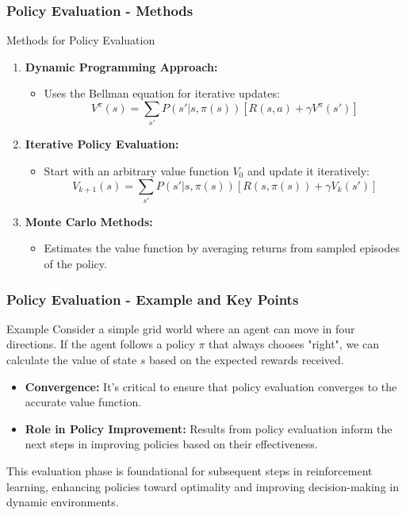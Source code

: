 \documentclass[aspectratio=169]{beamer}
\begin{document}
\begin{frame}[fragile]
    \frametitle{Policy Evaluation - Methods}
    \begin{block}{Methods for Policy Evaluation}
        \begin{enumerate}
            \item \textbf{Dynamic Programming Approach:}
            \begin{itemize}
                \item Uses the Bellman equation for iterative updates:
                \begin{equation}
                    V^\pi(s) = \sum_{s'} P(s'|s,\pi(s)) [R(s,a) + \gamma V^\pi(s')]
                \end{equation}
            \end{itemize}
            \item \textbf{Iterative Policy Evaluation:}
            \begin{itemize}
                \item Start with an arbitrary value function \(V_0\) and update it iteratively:
                \begin{equation}
                    V_{k+1}(s) = \sum_{s'} P(s'|s,\pi(s)) [R(s,\pi(s)) + \gamma V_k(s')]
                \end{equation}
            \end{itemize}
            \item \textbf{Monte Carlo Methods:}
            \begin{itemize}
                \item Estimates the value function by averaging returns from sampled episodes of the policy.
            \end{itemize}
        \end{enumerate}
    \end{block}
\end{frame}

\begin{frame}[fragile]
    \frametitle{Policy Evaluation - Example and Key Points}
    \begin{block}{Example}
        Consider a simple grid world where an agent can move in four directions. If the agent follows a policy \(\pi\) that always chooses "right", we can calculate the value of state \(s\) based on the expected rewards received.
    \end{block}
    
    \begin{itemize}
        \item \textbf{Convergence:} It's critical to ensure that policy evaluation converges to the accurate value function.
        \item \textbf{Role in Policy Improvement:} Results from policy evaluation inform the next steps in improving policies based on their effectiveness.
    \end{itemize}
    
    This evaluation phase is foundational for subsequent steps in reinforcement learning, enhancing policies toward optimality and improving decision-making in dynamic environments.
\end{frame}
\end{document}
